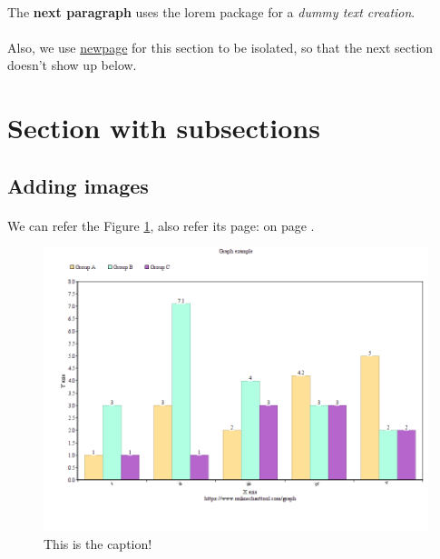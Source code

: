\documentclass[a4paper,12pt]{article}
\begin{document}
    \paragraph*{} The \textbf{next paragraph} uses the lorem package for a \textit{dummy text creation}.
    \paragraph*{} \lipsum[2-3]
    \paragraph*{} Also, we use \underline{newpage} for this section to be isolated, so that the next section doesn't show up below.
\newpage

\section{Section with subsections}
    \subsection{Adding images}
        \paragraph*{} We can refer the Figure \ref{fig:imglabel01}, also refer its page: on page \pageref{fig:imglabel01}.

        \begin{figure}[h]
            \centering
            \label{fig:imglabel01}
            \includegraphics[width=1\textwidth]{img/chart01.png}
            \caption{This is the caption!}
        \end{figure}
\end{document}

